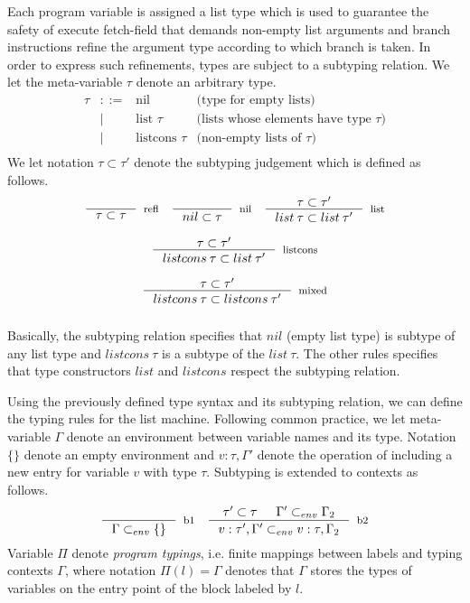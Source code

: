 \documentclass[sigconf]{acmart}
\theoremstyle{definition}
\begin{document}
Each program variable is assigned a list type which is used to guarantee the safety of execute
fetch-field that demands non-empty list arguments and branch instructions refine the argument type
according to which branch is taken. In order to express such refinements, types are subject to a
subtyping relation. We let the meta-variable $\tau$ denote an arbitrary type. 
\[
\begin{array}{rcll}
  \tau & ::=  & \text{nil} & \text{(type for empty lists)}\\
       & \mid & \text{list }\tau & \text{(lists whose elements have type $\tau$)}\\
       & \mid & \text{listcons }\tau & \text{(non-empty lists of $\tau$)}\\
\end{array}
\]
We let notation $\tau \subset \tau'$
denote the subtyping judgement which is defined as follows.
\[
\begin{array}{ccc}
  \inference{}
            {\tau\subset \tau}
            [refl]
  &
  \inference{}
            {nil \subset \tau}
            [nil]
  &
  \inference{\tau \subset \tau'}
            {list\:\tau\subset list\:\tau'}
            [list]\\\\
  \multicolumn{3}{c}{
  \inference{\tau \subset \tau'}
            {listcons\:\tau\subset list\:\tau'}
            [listcons]} \\\\
            \multicolumn{3}{c}{
            \inference{\tau \subset \tau'}
            {listcons\:\tau\subset listcons\:\tau'}
            [mixed]} \\\\
\end{array}
\]
Basically, the subtyping relation specifies that $nil$ (empty list type) is
subtype of any list type and $listcons\:\tau$ is a subtype of the $list\:\tau$.
The other rules specifies that type constructors $list$ and $listcons$ respect
the subtyping relation.

Using the previously defined type syntax and its subtyping relation, we can
define the typing rules for the list machine. Following common practice, we
let meta-variable $\Gamma$ denote an environment between variable names and
its type. Notation $\{\}$ denote an empty environment and $v : \tau , \Gamma'$
denote the operation of including a new entry for variable $v$ with type $\tau$.
Subtyping is extended to contexts as follows.
\[
\begin{array}{cc}
  \inference{}
            {\Gamma \subset_{env} \{\}}[b1]
  &
  \inference{\tau' \subset \tau & \Gamma' \subset_{env} \Gamma_2}
            {v : \tau' , \Gamma' \subset_{env} v : \tau , \Gamma_2}
            [b2]
\end{array}
\]
Variable $\Pi$ denote \emph{program typings}, i.e. finite mappings between labels and typing contexts $\Gamma$,
where notation $\Pi(l) = \Gamma$ denotes that $\Gamma$ stores the types of variables on the entry point of the block
labeled by $l$. 
\end{document}
